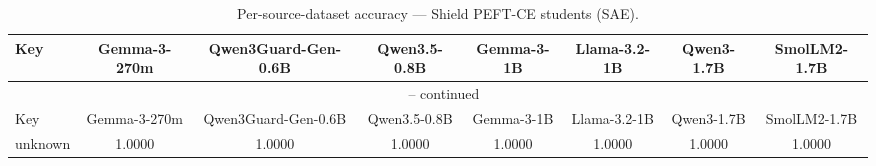\begin{landscape}
\begin{longtable}{lccccccc}
\caption{Per-source-dataset accuracy — Shield PEFT-CE students (SAE).} \\
\label{tab:students_peft_ce_per_dataset_sae}
\toprule
Key & Gemma-3-270m & Qwen3Guard-Gen-0.6B & Qwen3.5-0.8B & Gemma-3-1B & Llama-3.2-1B & Qwen3-1.7B & SmolLM2-1.7B \\
\midrule
\endfirsthead
\multicolumn{8}{c}{\tablename\ \thetable{} -- continued} \\
\toprule
Key & Gemma-3-270m & Qwen3Guard-Gen-0.6B & Qwen3.5-0.8B & Gemma-3-1B & Llama-3.2-1B & Qwen3-1.7B & SmolLM2-1.7B \\
\midrule
\endhead
unknown & 1.0000 & 1.0000 & 1.0000 & 1.0000 & 1.0000 & 1.0000 & 1.0000 \\
\bottomrule
\end{longtable}
\end{landscape}